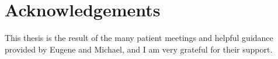 \chapter*{Acknowledgements}

This thesis is the result of the many patient meetings and helpful guidance provided by Eugene and Michael, and I am very grateful for their support.